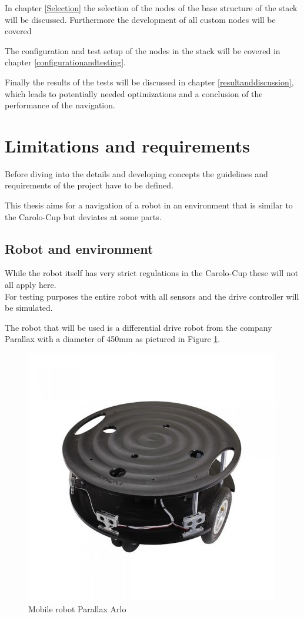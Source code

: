 In chapter \ref{Selection} the selection of the nodes of the base structure of the stack will be discussed. Furthermore the development of all custom nodes will be covered

The configuration and test setup of the nodes in the stack will be covered in chapter \ref{configurationandtesting}.


Finally the results of the tests will be discussed in chapter \ref{resultanddiscussion}, which leads to potentially needed optimizations and a conclusion of the performance of the navigation.

\section{Limitations and requirements}

Before diving into the details and developing concepts the guidelines and requirements of the project have to be defined.

This thesis aims for a navigation of a robot in an environment that is similar to the Carolo-Cup but deviates at some parts.

\subsection{Robot and environment}
While the robot itself has very strict regulations in the Carolo-Cup these will not all apply here.\\

For testing purposes the entire robot with all sensors and the drive controller will be simulated.

The robot that will be used is a differential drive robot from the company Parallax with a diameter of 450mm as pictured in Figure \ref{arlore}.\\

\begin{figure}[H]
	\centering
	\includegraphics[width=.7\textwidth]{arlo real}
	
	\caption{Mobile robot Parallax Arlo \cite{arloreal}}
	\label{arlore}
\end{figure}


